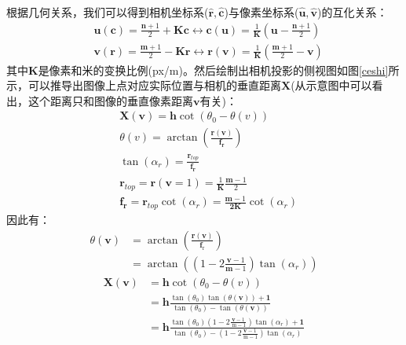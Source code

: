 \documentclass[cn,12pt,color=mine,scheme=chinese,bibstyle=gb7714-2015]{elegantbook}
\begin{document}
根据几何关系，我们可以得到相机坐标系($\hat{\mathbf{r}},\hat{\mathbf{c}}$)与像素坐标系($\hat{\mathbf{u}},\hat{\mathbf{v}}$)的互化关系：
\begin{equation}
	\begin{aligned}
		&\mathbf{u}(\mathbf{c})=\frac{\mathbf{n}+1}{2}+\mathbf{K} \mathbf{c} \longleftrightarrow \mathbf{c}(\mathbf{u})=\frac{1}{\mathbf{K}}\left(\mathbf{u}-\frac{\mathbf{n}+1}{2}\right)\\
		&\mathbf{v}(\mathbf{r})=\frac{\mathbf{m}+1}{2}-\mathbf{K r} \longleftrightarrow \mathbf{r}(\mathbf{v})=\frac{1}{\mathbf{K}}\left(\frac{\mathbf{m}+1}{2}-\mathbf{v}\right)
	\end{aligned}
\end{equation}
其中$\mathbf{K}$是像素和米的变换比例(px/m)。然后绘制出相机投影的侧视图如图\ref{ceshi}所示，可以推导出图像上点对应实际位置与相机的垂直距离$\mathbf{X}$(从示意图中可以看出，这个距离只和图像的垂直像素距离$\mathbf{v}$有关)：
\begin{align}
	&\mathbf{X}(\mathbf{v})=\mathbf{h} \cot \left(\theta_{0}-\theta(v)\right) \\
	&\theta(v)=\arctan \left(\frac{\mathbf{r}(\mathbf{v})}{\mathbf{f}_{\mathbf{r}}}\right) \\
	&\tan \left(\alpha_{r}\right)=\frac{\mathbf{r}_{t o p}}{\mathbf{f}_{\mathbf{r}}} \\
	&\mathbf{r}_{t o p}=\mathbf{r}(\mathbf{v}=1)=\frac{1}{\mathbf{K}} \frac{\mathbf{m}-1}{2} \\
	&\mathbf{f}_{\mathbf{r}}=\mathbf{r}_{t o p} \cot \left(\alpha_{r}\right)=\frac{\mathbf{m}-1}{\mathbf{2} \mathbf{K}} \cot \left(\alpha_{r}\right)
\end{align}
因此有：
\begin{equation}
\begin{aligned}
	\theta(\mathbf{v}) &=\arctan \left(\frac{\mathbf{r}(\mathbf{v})}{\mathbf{f}_{\mathrm{r}}}\right) \\
	&=\arctan \left(\left(1-2 \frac{\mathbf{v}-1}{\mathbf{m}-1}\right) \tan \left(\alpha_{r}\right)\right)
\end{aligned}
\end{equation}
\begin{equation}
\begin{aligned}
		\mathbf{X}(\mathbf{v}) &=\mathbf{h} \cot \left(\theta_{0}-\theta(v)\right) \\
		&=\mathbf{h} \frac{\tan \left(\theta_{0}\right) \tan (\theta(\mathbf{v}))+\mathbf{1}}{\tan \left(\theta_{0}\right)-\tan (\theta(\mathbf{v}))} \\
		&=\mathbf{h} \frac{\tan \left(\theta_{0}\right)\left(1-2 \frac{\mathbf{v}-1}{\mathrm{~m}-1}\right) \tan \left(\alpha_{r}\right)+\mathbf{1}}{\tan \left(\theta_{0}\right)-\left(1-2 \frac{\mathbf{v}-1}{\mathrm{~m}-1}\right) \tan \left(\alpha_{r}\right)}
\end{aligned}
\end{equation}
\end{document}
